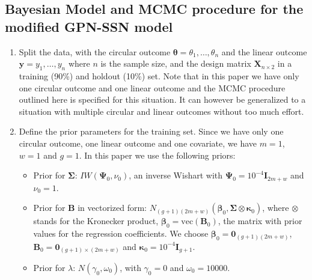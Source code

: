 \documentclass[12pt,]{article}
\begin{document}
\newpage

\subsection{Bayesian Model and MCMC procedure for the modified GPN-SSN model}\label{A3}

\begin{enumerate}
\item Split the data, with the circular outcome $\boldsymbol{\theta} = \theta_1, \dots, \theta_n$ and the linear outcome $\boldsymbol{y} = y_1, \dots, y_n$ where $n$ is the sample size, and the design matrix $\boldsymbol{X}_{n \times 2}$ in a training (90\%) and holdout (10\%) set. Note that in this paper we have only one circular outcome and one linear outcome and the MCMC procedure outlined here is specified for this situation. It can however be generalized to a situation with multiple circular and linear outcomes without too much effort. 
\item Define the prior parameters for the training set. Since we have only one circular outcome, one linear outcome and one covariate, we have $m = 1$, $w = 1$ and $g = 1$. In this paper we use the following priors:

\begin{itemize}
\item Prior for $\boldsymbol{\Sigma}$: $IW(\boldsymbol{\Psi}_0, \nu_0)$, an inverse Wishart with $\boldsymbol{\Psi}_0 = 10^{-4}\boldsymbol{I}_{2m + w}$ and $\nu_0 = 1$.   
\item Prior for $\boldsymbol{B}$ in vectorized form: $N_{(g + 1)(2m + w)}(\boldsymbol{\beta}_0, \boldsymbol{\Sigma}  \otimes \boldsymbol{\kappa}_0)$, where $\otimes$ stands for the Kronecker product, $\boldsymbol{\beta}_0 = \text{vec}(\boldsymbol{B}_0)$, the matrix with prior values for the regression coefficients. We choose $\boldsymbol{\beta}_0 = \boldsymbol{0}_{(g + 1)(2m + w)}$, $\boldsymbol{B}_0 = \boldsymbol{0}_{(g + 1) \times (2m + w)}$ and $\boldsymbol{\kappa}_0 = 10^{-4}\boldsymbol{I}_{g + 1}$.
\item Prior for $\lambda$: $N(\gamma_0, \omega_0)$, with $\gamma_0 = 0$ and $\omega_0 = 10000$.
\end{itemize}


\end{enumerate}
\end{document}
